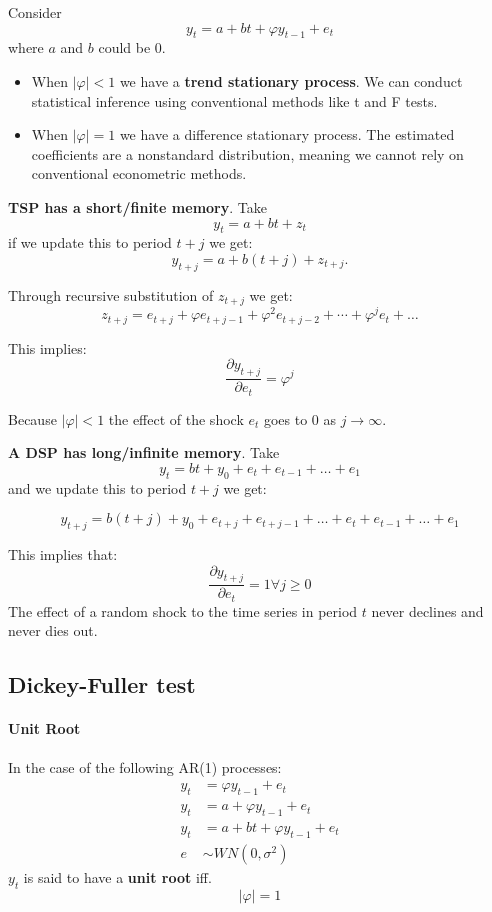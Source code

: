 \documentclass[11pt]{article}
\begin{document}
Consider
\[y_t = a + bt + \varphi y_{t-1} + e_t\]
where $a$ and $b$ could be 0.
\begin{itemize}
    \item When $|\varphi|<1$ we have a \textbf{trend stationary process}. We can conduct statistical inference using conventional methods like t and F tests.
    \item When $|\varphi|=1$ we have a difference stationary process. The estimated coefficients are a nonstandard distribution, meaning we cannot rely on conventional econometric methods.
\end{itemize}

\textbf{TSP has a short/finite memory}. Take
\[y_t = a + bt + z_t\]
if we update this to period $t+j$ we get:
\[y_{t+j} = a + b(t+j) + z_{t+j}.\]

Through recursive substitution of $z_{t+j}$ we get:
\begin{equation}
z_{t+j}=e_{t+j}+\varphi e_{t+j-1}+\varphi^2 e_{t+j-2}+\cdots+\varphi^j e_t+\ldots
\end{equation}

This implies:
\begin{equation}
\frac{\partial y_{t+j}}{\partial e_t}=\varphi^j
\end{equation}

Because $|\varphi|<1$ the effect of the shock $e_t$ goes to 0 as $j\rightarrow\infty$.

\textbf{A DSP has long/infinite memory}. Take
\[y_t = bt + y_0 + e_t + e_{t-1} + \ldots + e_1\]
and we update this to period $t+j$ we get:

\[y_{t+j} = b(t+j) + y_0 + e_{t+j} + e_{t+j-1} + \ldots + e_t + e_{t-1} + \ldots + e_1\]

This implies that:
\begin{equation}
\frac{\partial y_{t+j}}{\partial e_t}=1 \forall j \geq 0
\end{equation}
The effect of a random shock to the time series in period $t$ never declines and never dies out.

\clearpage
\subsection{Dickey-Fuller test}

\begin{mdframed}
    \paragraph{Unit Root} \mbox{}

    In the case of the following AR(1) processes:
    \begin{align*}
        y_t &= \varphi y_{t-1} + e_t \\
        y_t &= a + \varphi y_{t-1} + e_t \\
        y_t &= a + bt + \varphi y_{t-1} + e_t \\
        e &\sim WN(0,\sigma^2)
    \end{align*}
    $y_t$ is said to have a \textbf{unit root} iff.
    \[|\varphi|=1\]
\end{mdframed}
\end{document}
